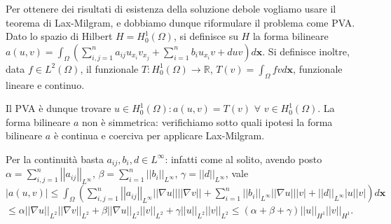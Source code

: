 \documentclass{article}
\begin{document}
Per ottenere dei risultati di esistenza della soluzione debole vogliamo
usare il teorema di Lax-Milgram, e dobbiamo dunque riformulare il problema
come PVA. Dato lo spazio di Hilbert $H=H_{0}^{1}\left( \Omega \right) $, si
definisce su $H$ la forma bilineare $a\left( u,v\right) =\int_{\Omega
}\left(
\sum_{i,j=1}^{n}a_{ij}u_{x_{i}}v_{x_{j}}+\sum_{i=1}^{n}b_{i}u_{x_{i}}v+duv%
\right) d\mathbf{x}$. Si definisce inoltre, data $f\in L^{2}\left( \Omega
\right) $, il funzionale $T:H_{0}^{1}\left( \Omega \right) \rightarrow 
\mathbb{R}
$, $T\left( v\right) =\int_{\Omega }fvd\mathbf{x}$, funzionale lineare e
continuo.

Il PVA \`{e} dunque trovare $u\in H_{0}^{1}\left( \Omega \right) :a\left(
u,v\right) =T\left( v\right) $ $\forall $ $v\in H_{0}^{1}\left( \Omega
\right) $. La forma bilineare $a$ non \`{e} simmetrica: verifichiamo sotto
quali ipotesi la forma bilineare $a$ \`{e} continua e coerciva per applicare
Lax-Milgram.

Per la continuit\`{a} basta $a_{ij},b_{i},d\in L^{\infty }$: infatti come al
solito, avendo posto $\alpha =\sum_{i,j=1}^{n}\left\vert \left\vert
a_{ij}\right\vert \right\vert _{L^{\infty }}$, $\beta
=\sum_{i=1}^{n}\left\vert \left\vert b_{i}\right\vert \right\vert
_{L^{\infty }}$, $\gamma =\left\vert \left\vert d\right\vert \right\vert
_{L^{\infty }}$, vale $\left\vert a\left( u,v\right) \right\vert \leq
\int_{\Omega }\left( \sum_{i,j=1}^{n}\left\vert \left\vert a_{ij}\right\vert
\right\vert _{L^{\infty }}\left\vert \left\vert \nabla u\right\vert
\right\vert \left\vert \left\vert \nabla v\right\vert \right\vert
+\sum_{i=1}^{n}\left\vert \left\vert b_{i}\right\vert \right\vert
_{L^{\infty }}\left\vert \left\vert \nabla u\right\vert \right\vert
\left\vert v\right\vert +\left\vert \left\vert d\right\vert \right\vert
_{L^{\infty }}\left\vert u\right\vert \left\vert v\right\vert \right) d%
\mathbf{x}$ $\leq \alpha \left\vert \left\vert \nabla u\right\vert
\right\vert _{L^{2}}\left\vert \left\vert \nabla v\right\vert \right\vert
_{L^{2}}+\beta \left\vert \left\vert \nabla u\right\vert \right\vert
_{L^{2}}\left\vert \left\vert v\right\vert \right\vert _{L^{2}}+\gamma
\left\vert \left\vert u\right\vert \right\vert _{L^{2}}\left\vert \left\vert
v\right\vert \right\vert _{L^{2}}\leq \left( \alpha +\beta +\gamma \right)
\left\vert \left\vert u\right\vert \right\vert _{H^{1}}\left\vert \left\vert
v\right\vert \right\vert _{H^{1}}$.
\end{document}
